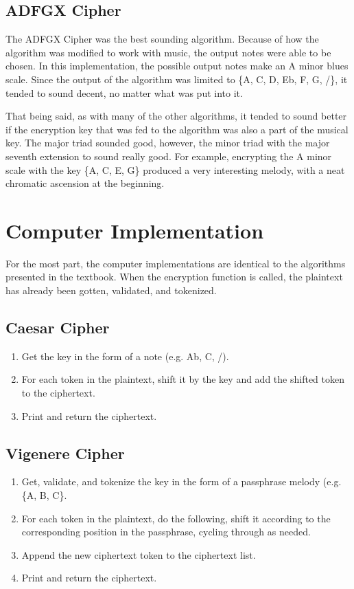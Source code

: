 \documentclass[14pt]{article}
\begin{document}
        \subsection{ADFGX Cipher}
        The ADFGX Cipher was the best sounding algorithm. Because of how the algorithm was modified to work with music, the output notes were able to be chosen. In this implementation, the possible output notes make an A minor blues scale. Since the output of the algorithm was limited to \{A, C, D, Eb, F, G, /\}, it tended to sound decent, no matter what was put into it.

        That being said, as with many of the other algorithms, it tended to sound better if the encryption key that was fed to the algorithm was also a part of the musical key. The major triad sounded good, however, the minor triad with the major seventh extension to sound really good. For example, encrypting the A minor scale with the key \{A, C, E, G\} produced a very interesting melody, with a neat chromatic ascension at the beginning.
        

	\section{Computer Implementation}
    For the most part, the computer implementations are identical to the algorithms presented in the textbook. When the encryption function is called, the plaintext has already been gotten, validated, and tokenized.
    	\subsection{Caesar Cipher}
        \begin{enumerate}
            \item Get the key in the form of a note (e.g. Ab, C, /).
            \item For each token in the plaintext, shift it by the key and add the shifted token to the ciphertext.
            \item Print and return the ciphertext.
        \end{enumerate}
        
    	\subsection{Vigenere Cipher}
        \begin{enumerate}
            \item Get, validate, and tokenize the key in the form of a passphrase melody (e.g. \{A, B, C\}.
            \item For each token in the plaintext, do the following, shift it according to the corresponding position in the passphrase, cycling through as needed.
            \item Append the new ciphertext token to the ciphertext list.
            \item Print and return the ciphertext.
        \end{enumerate}
        
\end{document}
